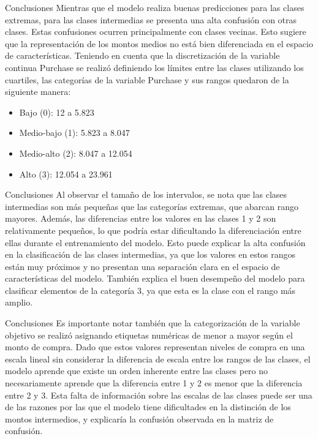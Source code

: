 \documentclass{beamer}
\begin{document}
    \begin{frame}{Conclusiones}
        Mientras que el modelo realiza buenas predicciones para las clases extremas, para las clases intermedias 
        se presenta una alta confusión con otras clases. Estas confusiones ocurren principalmente con 
        clases vecinas. Esto sugiere que la representación 
        de los montos medios no está bien diferenciada en el espacio de características. 
        \linebreak
        Teniendo en cuenta que la discretización de la variable continua Purchase se realizó definiendo los 
        límites entre las clases utilizando los cuartiles, las categorías de la variable Purchase y sus rangos quedaron de la siguiente manera:
        \begin{itemize}
            \item Bajo (0): 12 a 5.823
            \item Medio-bajo (1): 5.823 a 8.047
            \item Medio-alto (2): 8.047 a 12.054
            \item Alto (3): 12.054 a 23.961
        \end{itemize}
    \end{frame}
    \begin{frame}{Conclusiones}
        Al observar el tamaño de los intervalos, se nota que las clases intermedias son más pequeñas 
        que las categorías extremas, que abarcan rango mayores. Además, las diferencias entre los 
        valores en las clases 1 y 2 son relativamente pequeños, lo que podría estar dificultando la diferenciación 
        entre ellas durante el entrenamiento del modelo.
        \linebreak
        Esto puede explicar la alta confusión en la clasificación de las clases intermedias, ya que los valores 
        en estos rangos están muy próximos y no presentan una separación clara en el espacio de características del modelo. También 
        explica el buen desempeño del modelo para clasificar elementos de la categoría 3, ya que esta es la clase con el rango más amplio.
    \end{frame}
    \begin{frame}{Conclusiones}
        Es importante notar también que la categorización de la variable objetivo se realizó
        asignando etiquetas numéricas de menor a mayor según el monto de compra.
        \linebreak
        Dado que estos valores representan niveles de compra en una escala lineal sin considerar la diferencia de escala entre los rangos de las clases, 
        el modelo aprende que existe un orden inherente entre las clases pero no necesariamente aprende que la 
        diferencia entre 1 y 2 es menor que la diferencia entre 2 y 3.
        \linebreak
        Esta falta de información sobre las escalas de las clases puede ser una de las razones por las que el 
        modelo tiene dificultades en la distinción de los montos intermedios, y explicaría la confusión observada en la matriz de confusión.
    \end{frame}
\end{document}
